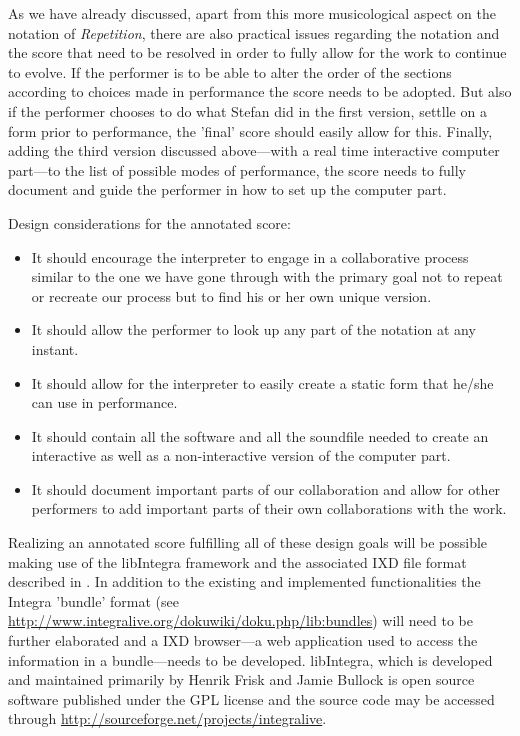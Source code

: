 As we have already discussed, apart from this more musicological
aspect on the notation of \emph{Repetition}, there are also practical
issues regarding the notation and the score that need to be resolved
in order to fully allow for the work to continue to evolve. If the
performer is to be able to alter the order of the sections according
to choices made in performance the score needs to be adopted. But also
if the performer chooses to do what Stefan did in the first version,
settlle on a form prior to performance, the 'final' score should
easily allow for this. Finally, adding the third version discussed
above---with a real time interactive computer part---to the list of
possible modes of performance, the score needs to fully document and
guide the performer in how to set up the computer part.

Design considerations for the annotated score:
\begin{itemize}
\item It should encourage the interpreter to engage in a
  collaborative process similar to the one we have gone through with
  the primary goal not to repeat or recreate our process but to find
  his or her own unique version.
\item It should allow the performer to look up any part of the notation at any
  instant.
\item It should allow for the interpreter to easily create a static
  form that he/she can use in performance.
\item It should contain all the software and all the soundfile needed
  to create an interactive as well as a non-interactive version of the
  computer part.
\item It should document important parts of our collaboration and
  allow for other performers to add important parts of their own
  collaborations with the work.
\end{itemize}

Realizing an annotated score fulfilling all of these design goals will
be possible making use of the libIntegra framework and the associated
IXD file format described in \citet{frisk-bull07}. In addition to the
existing and implemented functionalities the Integra 'bundle' format
(see \url{http://www.integralive.org/dokuwiki/doku.php/lib:bundles})
will need to be further elaborated and a IXD browser---a web
application used to access the information in a bundle---needs to be
developed. libIntegra, which is developed and maintained primarily by Henrik
Frisk and Jamie Bullock is open source software published under the
GPL license and the source code may be accessed through
\url{http://sourceforge.net/projects/integralive}.


